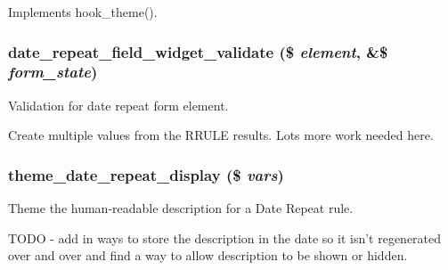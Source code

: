 \label{date__repeat__field_8module_a7c686d7c8b75e0b277263535a9b6fbce}
Implements hook\_\-theme(). \hypertarget{date__repeat__field_8module_aa1797d26d6677578e187b06636d0f9a0}{
\subsubsection[{date\_\-repeat\_\-field\_\-widget\_\-validate}]{\setlength{\rightskip}{0pt plus 5cm}date\_\-repeat\_\-field\_\-widget\_\-validate (\$ {\em element}, \/  \&\$ {\em form\_\-state})}}
\label{date__repeat__field_8module_aa1797d26d6677578e187b06636d0f9a0}
Validation for date repeat form element.

Create multiple values from the RRULE results. Lots more work needed here. \hypertarget{date__repeat__field_8module_aa7f03cf9bae57e4c06944720468a5d7b}{
\subsubsection[{theme\_\-date\_\-repeat\_\-display}]{\setlength{\rightskip}{0pt plus 5cm}theme\_\-date\_\-repeat\_\-display (\$ {\em vars})}}
\label{date__repeat__field_8module_aa7f03cf9bae57e4c06944720468a5d7b}
Theme the human-\/readable description for a Date Repeat rule.

TODO -\/ add in ways to store the description in the date so it isn't regenerated over and over and find a way to allow description to be shown or hidden. 